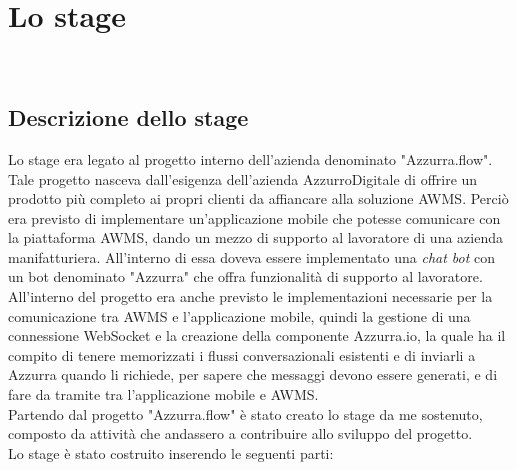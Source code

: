 
\chapter{Lo stage}
\label{cap:descrizione-stage}

\\

\section{Descrizione dello stage}
Lo stage era legato al progetto interno dell'azienda denominato "Azzurra.flow". Tale progetto nasceva dall'esigenza dell'azienda AzzurroDigitale di offrire un prodotto più completo ai propri clienti da affiancare alla soluzione \gls{AWMS}. Perciò era previsto di implementare un’applicazione mobile che potesse comunicare con la piattaforma \gls{AWMS}, dando un mezzo di supporto al lavoratore di una azienda manifatturiera. All'interno di essa doveva essere implementato una \emph{chat bot} con un \gls{bot}\ap{[g]} denominato "Azzurra" che offra funzionalità di supporto al lavoratore. All'interno del progetto era anche previsto le implementazioni necessarie per la comunicazione tra \gls{AWMS} e l'applicazione mobile, quindi la gestione di una connessione \gls{WebSocket}\ap{[g]} e la creazione della componente Azzurra.io, la quale ha il compito di tenere memorizzati i flussi conversazionali esistenti e di inviarli a Azzurra quando li richiede, per sapere che messaggi devono essere generati, e di fare da tramite tra l'applicazione mobile e \gls{AWMS}.\\
Partendo dal progetto "Azzurra.flow" è stato creato lo stage da me sostenuto, composto da attività che andassero a contribuire allo sviluppo del progetto. \\
Lo stage è stato costruito inserendo le seguenti parti:

